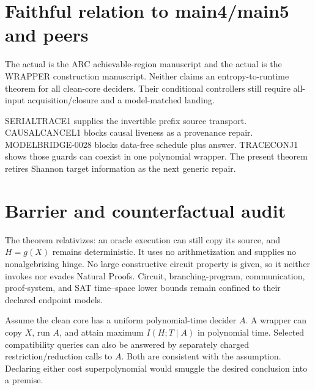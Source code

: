 \documentclass[11pt]{article}
\begin{document}
\section*{Faithful relation to main4/main5 and peers}
The actual  is the ARC achievable-region manuscript and the
actual  is the WRAPPER construction manuscript.  Neither
claims an entropy-to-runtime theorem for all clean-core deciders.  Their
conditional controllers still require all-input acquisition/closure and a
model-matched landing.

\textsf{SERIALTRACE1} supplies the invertible prefix source transport.
\textsf{CAUSALCANCEL1} blocks causal liveness as a provenance repair.
\textsf{MODELBRIDGE-0028} blocks data-free schedule plus answer.
\textsf{TRACECONJ1} shows those guards can coexist in one polynomial wrapper.
The present theorem retires Shannon target information as the next generic
repair.

\section*{Barrier and counterfactual audit}
The theorem relativizes: an oracle execution can still copy its source, and
$H=g(X)$ remains deterministic.  It uses no arithmetization and supplies no
nonalgebrizing hinge.  No large constructive circuit property is given, so it
neither invokes nor evades Natural Proofs.  Circuit, branching-program,
communication, proof-system, and SAT time--space lower bounds remain confined
to their declared endpoint models.

Assume the clean core has a uniform polynomial-time decider $A$.  A wrapper
can copy $X$, run $A$, and attain maximum $I(H;T\mid A)$ in polynomial time.
Selected compatibility queries can also be answered by separately charged
restriction/reduction calls to $A$.  Both are consistent with the assumption.
Declaring either cost superpolynomial would smuggle the desired conclusion
into a premise.
\end{document}
